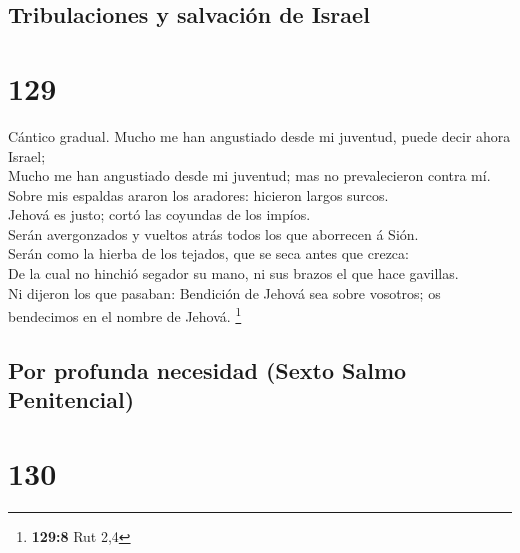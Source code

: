 \hypertarget{tribulaciones-y-salvaciuxf3n-de-israel}{%
\subsection{Tribulaciones y salvación de
Israel}\label{tribulaciones-y-salvaciuxf3n-de-israel}}

\hypertarget{section-128}{%
\section{129}\label{section-128}}

 Cántico gradual. Mucho me han angustiado desde mi juventud,
puede decir ahora Israel;\\
 Mucho me han angustiado desde mi juventud; mas no
prevalecieron contra mí.\\
 Sobre mis espaldas araron los aradores: hicieron largos
surcos.\\
 Jehová es justo; cortó las coyundas de los impíos.\\
 Serán avergonzados y vueltos atrás todos los que aborrecen
á Sión.\\
 Serán como la hierba de los tejados, que se seca antes que
crezca:\\
 De la cual no hinchió segador su mano, ni sus brazos el que
hace gavillas.\\
 Ni dijeron los que pasaban: Bendición de Jehová sea sobre
vosotros; os bendecimos en el nombre de Jehová. \footnote{\textbf{129:8}
  Rut 2,4}

\hypertarget{por-profunda-necesidad-sexto-salmo-penitencial}{%
\subsection{Por profunda necesidad (Sexto Salmo
Penitencial)}\label{por-profunda-necesidad-sexto-salmo-penitencial}}

\hypertarget{section-129}{%
\section{130}\label{section-129}}


